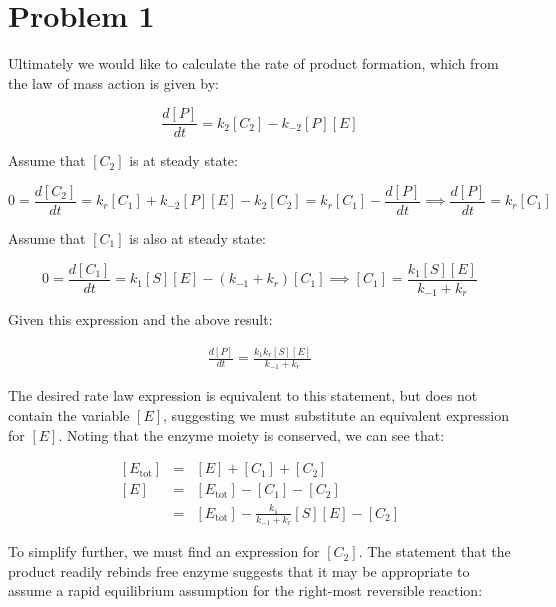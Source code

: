 \documentclass{article}
\begin{document}
\large

\section*{Problem 1}

Ultimately we would like to calculate the rate of product formation, which from the law of mass action is given by:

\[ \frac{d\left[ P \right]}{dt} = k_2 \left[ C_2 \right] - k_{-2} \left[ P \right] \left[ E \right] \]

Assume that $[C_2]$ is at steady state:

\[ 0 = \frac{d \left[ C_2 \right]}{dt} =  k_r \left[ C_1 \right] + k_{-2} \left[ P \right] \left[ E \right] - k_2 \left[ C_2 \right] = k_r \left[ C_1 \right]  -  \frac{d\left[ P \right]}{dt}   \implies  \frac{d\left[ P \right]}{dt}  = k_r \left[ C_1 \right] \]

Assume that $[C_1]$ is also at steady state:

\[ 0 = \frac{d \left[ C_1 \right]}{dt} =  k_1 \left[ S \right] \left[ E \right] -\left(  k_{-1} + k_r \right)  \left[ C_1 \right] \implies \left[ C_1 \right]  = \frac{k_1 \left[ S \right] \left[ E \right]}{k_{-1} + k_r} \]

Given this expression and the above result:

\begin{eqnarray}
 \frac{d\left[ P \right]}{dt}  = \frac{k_1 k_r \left[ S \right] \left[ E \right]}{k_{-1} + k_r} \label{eqn:prob1a} 
 \end{eqnarray}

The desired rate law expression is equivalent to this statement, but does not contain the variable $[E]$, suggesting we must substitute an equivalent expression for $[E]$. Noting that the enzyme moiety is conserved, we can see that:

\begin{eqnarray*}
\left[ E_{\textrm{tot}} \right]  & = &  \left[ E\right]  + \left[ C_1 \right] + \left[ C_2 \right]\\
 \left[ E\right] & = & \left[ E_{\textrm{tot}} \right] - \left[ C_1 \right] - \left[ C_2 \right]\\
 & = & \left[ E_{\textrm{tot}} \right] - \frac{k_1}{k_{-1} + k_r} \left[ S \right] \left[ E \right] - \left[ C_2 \right]
\end{eqnarray*}

To simplify further, we must find an expression for $[C_2]$. The statement that the product readily rebinds free enzyme suggests that it may be appropriate to assume a rapid equilibrium assumption for the right-most reversible reaction:
\end{document}
